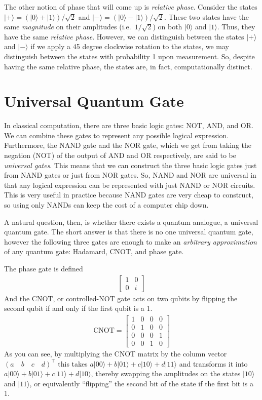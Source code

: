\documentclass[12pt,twoside]{reedthesis}
\newcommand{\ketz}{\ensuremath{\lvert 0\rangle}\xspace}
\newcommand{\keto}{\ensuremath{\lvert 1\rangle}\xspace}
\newcommand{\ket}[1]{\ensuremath{\lvert #1\rangle}\xspace}
\newcommand{\Hplus}{\ensuremath{\lvert + \rangle}\xspace}
\newcommand{\Hminus}{\ensuremath{\lvert- \rangle}\xspace}
\begin{document}
The other notion of phase that will come up is \textit{relative phase}. Consider the states $\Hplus = (\ketz + \keto)/\sqrt{2}$ and $\Hminus = (\ketz- \keto)/\sqrt{2}$. These two states have the same \textit{magnitude} on their amplitudes (i.e.~$1/\sqrt{2}$) on both $\ketz$ and $\keto$. Thus, they have the same \textit{relative phase}. However, we can distinguish between the states $\Hplus$ and $\Hminus$ if we apply a 45 degree clockwise rotation to the states, we may distinguish between the states with probability 1 upon measurement. So, despite having the same relative phase, the states are, in fact, computationally distinct.

\section{Universal Quantum Gate}
In classical computation, there are three basic logic gates: NOT, AND, and OR. We can combine these gates to represent any possible logical expression. Furthermore, the NAND gate and the NOR gate, which we get from taking the negation (NOT) of the output of AND and OR respectively, are said to be \textit{universal gates}. This means that we can construct the three basic logic gates just from NAND gates or just from NOR gates. So, NAND and NOR are universal in that any logical expression can be represented with just NAND or NOR circuits. This is very useful in practice because NAND gates are very cheap to construct, so using only NANDs can keep the cost of a computer chip down.

A natural question, then, is whether there exists a quantum analogue, a universal quantum gate. The short answer is that there is no one universal quantum gate, however the following three gates are enough to make an \textit{arbitrary approximation} of any quantum gate: Hadamard, CNOT, and phase gate. 

The phase gate is defined
\begin{align}
\begin{bmatrix}
1 & 0\\
0 & i 
\end{bmatrix}
\end{align}
And the CNOT, or controlled-NOT gate acts on two qubits by flipping the second qubit if and only if the first qubit is a 1. 
\begin{align}
\text{CNOT} = \begin{bmatrix}
1 & 0 & 0 & 0 \\
0 & 1 & 0 & 0 \\
0 & 0 & 0 & 1 \\
0 & 0 & 1 & 0
\end{bmatrix}
\end{align}
As you can see, by multiplying the CNOT matrix by the column vector $(a\quad b\quad c\quad d)^\intercal$ this takes $a\ket{00} + b\ket{01} + c\ket{10} + d\ket{11}$ and transforms it into $a\ket{00} + b\ket{01} + c\ket{11} + d\ket{10}$, thereby swapping the amplitudes on the states $\ket{10}$ and $\ket{11}$, or equivalently ``flipping'' the second bit of the state if the first bit is a 1. 
\end{document}
